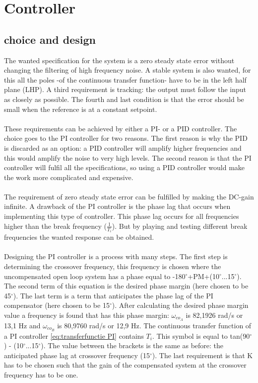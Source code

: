 \clearpage
\section{Controller}
\subsection{choice and design}
The wanted specification for the system is a zero steady state error without changing the filtering of high frequency noise. A stable system is also wanted, for this all the poles -of the continuous transfer function- have to be in the left half plane (LHP). A third requirement is tracking: the output must follow the input as closely as possible. The fourth and last condition is that the error should be small when the reference is at a constant setpoint.\\
\\
These requirements can be achieved by either a PI- or a PID controller. The choice goes to the PI controller for two reasons. The first reason is why the PID is discarded as an option: a PID controller will amplify higher frequencies and this would amplify the noise to very high levels. The second reason is that the PI controller will fulfil all the specifications, so using a PID controller would make the work more complicated and expensive.\\
\\
The requirement of zero steady state error can be fulfilled by making the DC-gain infinite. A drawback of the PI controller is the phase lag that occurs when implementing this type of controller. This phase lag occurs for all frequencies higher than the break frequency ($\frac{1}{T_{i}}$). But by playing and testing different break frequencies the wanted response can be obtained.\\
\\
Designing the PI controller is a process with many steps. The first step is determining the crossover frequency, this frequency is chosen where the uncompensated open loop system has a phase equal to -180$^{\circ}$+PM+(10$^{\circ}$...15$^{\circ}$). The second term of this equation is the desired phase margin (here chosen to be 45$^{\circ}$). The last term is a term that anticipates the phase lag of the PI compensator (here chosen to be 15$^{\circ}$). After calculating the desired phase margin value a frequency is found that has this phase margin: $\omega_{co_{A}}$ is 82,1926 rad/s or 13,1 Hz and $\omega_{co_{B}}$ is 80,9760 rad/s or 12,9 Hz. The continuous transfer function of a PI controller \ref{eq:transferfunctie PI} contains $T_{i}$. This symbol is equal to tan(90$^{\circ}$) - (10$^{\circ}$...15$^{\circ}$). The value between the brackets is the same as before: the anticipated phase lag at crossover frequency (15$^{\circ}$). The last requirement is that K has to be chosen such that the gain of the compensated system at the crossover frequency has to be one.\\

